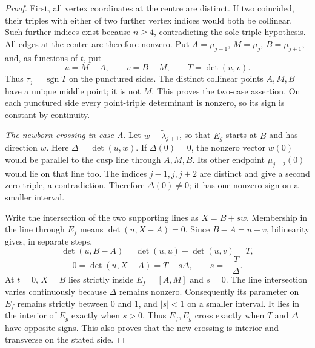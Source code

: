 \begin{proof}\leanok
First, all vertex coordinates at the centre are distinct. If two coincided,
their triples with either of two further vertex indices would both be
collinear. Such further indices exist because $n\geq4$, contradicting the
sole-triple hypothesis. All edges at the centre are therefore nonzero.
Put $A=\mu_{j-1}$, $M=\mu_j$, $B=\mu_{j+1}$, and, as functions of $t$, put
\begin{equation}\label{cusppr:local-data}
u=M-A,\qquad v=B-M,\qquad T=\det(u,v).
\end{equation}
Thus $\tau_j=\operatorname{sgn}T$ on the punctured sides. The distinct
collinear points $A,M,B$ have a unique middle point; it is not $M$.
This proves the two-case assertion. On each punctured side every point-triple
determinant is nonzero, so its sign is constant by continuity.

\emph{The newborn crossing in case A.}
Let $w=\widetilde\lambda_{j+1}$, so that $E_g$ starts at $B$ and has
direction $w$. Here $\Delta=\det(u,w)$. If $\Delta(0)=0$, the nonzero
vector $w(0)$ would be parallel to the cusp line through $A,M,B$.
Its other endpoint $\mu_{j+2}(0)$ would lie on that line too. The indices
$j-1,j,j+2$ are distinct and give a second zero triple, a contradiction.
Therefore $\Delta(0)\ne0$; it has one nonzero sign on a smaller interval.

Write the intersection of the two supporting lines as $X=B+s w$.
Membership in the line through $E_f$ means $\det(u,X-A)=0$.
Since $B-A=u+v$, bilinearity gives, in separate steps,
\begin{equation}\label{cusppr:A-det}
\det(u,B-A)=\det(u,u)+\det(u,v)=T,
\end{equation}
\begin{equation}\label{cusppr:A-intersection}
0=\det(u,X-A)=T+s\Delta,
\qquad s=-\frac{T}{\Delta}.
\end{equation}
At $t=0$, $X=B$ lies strictly inside $E_f=[A,M]$ and $s=0$.
The line intersection varies continuously because $\Delta$ remains nonzero.
Consequently its parameter on $E_f$ remains strictly between $0$ and $1$,
and $|s|<1$ on a smaller interval. It lies in the interior of $E_g$ exactly
when $s>0$. Thus $E_f,E_g$ cross exactly when $T$ and $\Delta$ have
opposite signs. This also proves that the new crossing is interior and
transverse on the stated side.


\end{proof}
